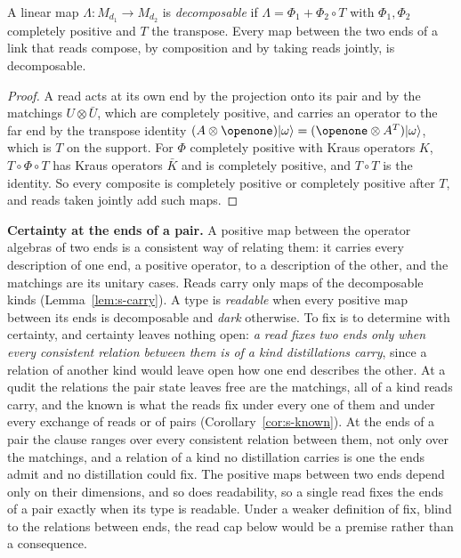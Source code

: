 \begin{lemma}
\label{lem:s-carry}
A linear map $\Lambda:M_{d_{1}}\to M_{d_{2}}$ is \emph{decomposable} if $\Lambda=\Phi_{1}+\Phi_{2}\circ T$ with $\Phi_{1},\Phi_{2}$ completely positive and $T$ the transpose. Every map between the two ends of a link that reads compose, by composition and by taking reads jointly, is decomposable.
\end{lemma}
\begin{proof}
A read acts at its own end by the projection onto its pair and by the matchings $U\otimes\bar{U}$, which are completely positive, and carries an operator to the far end by the transpose identity $(A\otimes\openone)\ket{\omega}=(\openone\otimes A^{T})\ket{\omega}$, which is $T$ on the support. For $\Phi$ completely positive with Kraus operators $K$, $T\circ\Phi\circ T$ has Kraus operators $\bar{K}$ and is completely positive, and $T\circ T$ is the identity. So every composite is completely positive or completely positive after $T$, and reads taken jointly add such maps.
\end{proof}

\textbf{Certainty at the ends of a pair.} A positive map between the operator algebras of two ends is a consistent way of relating them: it carries every description of one end, a positive operator, to a description of the other, and the matchings are its unitary cases. Reads carry only maps of the decomposable kinds (Lemma~\ref{lem:s-carry}). A type is \emph{readable} when every positive map between its ends is decomposable and \emph{dark} otherwise. To fix is to determine with certainty, and certainty leaves nothing open: \emph{a read fixes two ends only when every consistent relation between them is of a kind distillations carry}, since a relation of another kind would leave open how one end describes the other. At a qudit the relations the pair state leaves free are the matchings, all of a kind reads carry, and the known is what the reads fix under every one of them and under every exchange of reads or of pairs (Corollary~\ref{cor:s-known}). At the ends of a pair the clause ranges over every consistent relation between them, not only over the matchings, and a relation of a kind no distillation carries is one the ends admit and no distillation could fix. The positive maps between two ends depend only on their dimensions, and so does readability, so a single read fixes the ends of a pair exactly when its type is readable. Under a weaker definition of fix, blind to the relations between ends, the read cap below would be a premise rather than a consequence.

